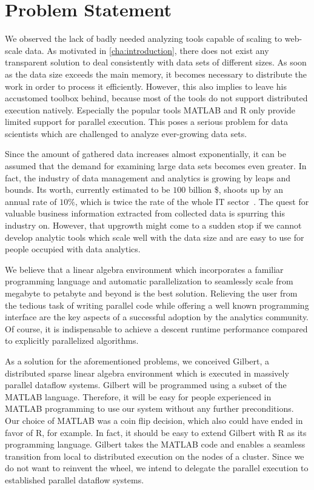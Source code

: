 \chapter{Problem Statement}
\label{cha:problemstatement}


We observed the lack of badly needed analyzing tools capable of scaling to web-scale data.
As motivated in \cref{cha:introduction}, there does not exist any transparent solution to deal consistently with data sets of different sizes.
As soon as the data size exceeds the main memory, it becomes necessary to distribute the work in order to process it efficiently.
However, this also implies to leave his accustomed toolbox behind, because most of the tools do not support distributed execution natively.
Especially the popular tools MATLAB and R only provide limited support for parallel execution.
This poses a serious problem for data scientists which are challenged to analyze ever-growing data sets.

Since the amount of gathered data increases almost exponentially, it can be assumed that the demand for examining large data sets becomes even greater.
In fact, the industry of data management and analytics is growing by leaps and bounds.
Its worth, currently estimated to be $100$ billion \$, shoots up by an annual rate of $10\%$, which is twice the rate of the whole IT sector~\cite{economist}.
The quest for valuable business information extracted from collected data is spurring this industry on.
However, that upgrowth might come to a sudden stop if we cannot develop analytic tools which scale well with the data size and are easy to use for people occupied with data analytics.

We believe that a linear algebra environment which incorporates a familiar programming language and automatic parallelization to seamlessly scale from megabyte to petabyte and beyond is the best solution.
Relieving the user from the tedious task of writing parallel code while offering a well known programming interface are the key aspects of a successful adoption by the analytics community.
Of course, it is indispensable to achieve a descent runtime performance compared to explicitly parallelized algorithms.

As a solution for the aforementioned problems, we conceived Gilbert, a distributed sparse linear algebra environment which is executed in massively parallel dataflow systems.
Gilbert will be programmed using a subset of the MATLAB language.
Therefore, it will be easy for people experienced in MATLAB programming to use our system without any further preconditions.
Our choice of MATLAB was a coin flip decision, which also could have ended in favor of R, for example.
In fact, it should be easy to extend Gilbert with R as its programming language.
Gilbert takes the MATLAB code and enables a seamless transition from local to distributed execution on the nodes of a cluster.
Since we do not want to reinvent the wheel, we intend to delegate the parallel execution to established parallel dataflow systems.

